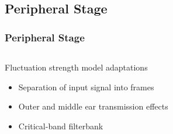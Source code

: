 \documentclass{beamer}
\begin{document}
\subsection{Peripheral Stage}
\begin{frame}
  \frametitle{Peripheral Stage}
  \begin{columns}
    \begin{column}{0.5\textwidth}
    Fluctuation strength model adaptations
      \begin{itemize}
        \item<1-> Separation of input signal into frames
        \item<2-> Outer and middle ear transmission effects
        \item<3-> Critical-band filterbank
      \end{itemize}
    \end{column}
    \begin{column}{0.5\textwidth}
    \end{column}
  \end{columns}
\end{frame}
\end{document}
